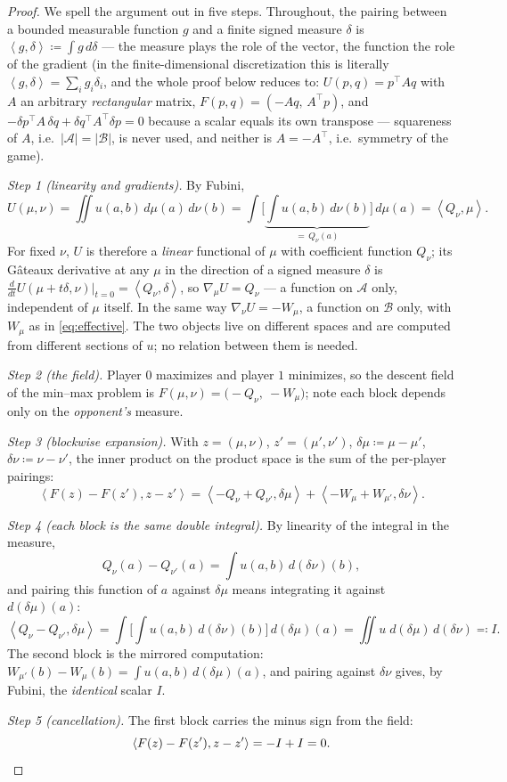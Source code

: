 \documentclass[11pt]{article}
\theoremstyle{definition}
\newcommand{\cA}{\mathcal{A}}
\newcommand{\cB}{\mathcal{B}}
\newcommand{\ip}[2]{\left\langle #1, #2 \right\rangle}
\begin{document}
\begin{proof}
We spell the argument out in five steps. Throughout, the pairing between a
bounded measurable function $g$ and a finite signed measure $\delta$ is
$\ip{g}{\delta} \coloneqq \int g\, d\delta$ --- the measure plays the role of
the vector, the function the role of the gradient (in the finite-dimensional
discretization this is literally $\ip{g}{\delta} = \sum_i g_i \delta_i$, and
the whole proof below reduces to: $U(p,q) = p^\top\! A q$ with $A$ an arbitrary
\emph{rectangular} matrix, $F(p,q) = (-Aq,\, A^\top\! p)$, and
$-\delta p^\top\! A\, \delta q + \delta q^\top\! A^\top \delta p = 0$ because a
scalar equals its own transpose --- squareness of $A$, i.e.\ $|\cA| = |\cB|$,
is never used, and neither is $A = -A^\top$, i.e.\ symmetry of the game).

\emph{Step 1 (linearity and gradients).} By Fubini,
\[
  U(\mu, \nu) = \iint u(a,b)\, d\mu(a)\, d\nu(b)
  = \int \Big[\underbrace{\textstyle\int u(a,b)\, d\nu(b)}_{=\, Q_\nu(a)}
  \Big]\, d\mu(a) = \ip{Q_\nu}{\mu}.
\]
For fixed $\nu$, $U$ is therefore a \emph{linear} functional of $\mu$ with
coefficient function $Q_\nu$; its G\^ateaux derivative at any $\mu$ in the
direction of a signed measure $\delta$ is
$\tfrac{d}{dt} U(\mu + t\delta, \nu)\big|_{t=0} = \ip{Q_\nu}{\delta}$,
so $\nabla_\mu U = Q_\nu$ --- a function on $\cA$ only, independent of $\mu$
itself. In the same way $\nabla_\nu U = -W_\mu$, a function on $\cB$ only,
with $W_\mu$ as in \eqref{eq:effective}. The two objects live on different
spaces and are computed from different sections of $u$; no relation between
them is needed.

\emph{Step 2 (the field).} Player $0$ maximizes and player $1$ minimizes, so
the descent field of the min--max problem is
$F(\mu, \nu) = \big({-}Q_\nu,\ -W_\mu\big)$; note each block depends only on
the \emph{opponent's} measure.

\emph{Step 3 (blockwise expansion).} With $z = (\mu,\nu)$, $z' = (\mu',\nu')$,
$\delta\mu \coloneqq \mu - \mu'$, $\delta\nu \coloneqq \nu - \nu'$, the inner
product on the product space is the sum of the per-player pairings:
\[
  \ip{F(z) - F(z')}{z - z'}
  = \ip{-Q_\nu + Q_{\nu'}}{\delta\mu} + \ip{-W_\mu + W_{\mu'}}{\delta\nu}.
\]

\emph{Step 4 (each block is the same double integral).} By linearity of the
integral in the measure,
\[
  Q_\nu(a) - Q_{\nu'}(a) = \int u(a,b)\, d(\delta\nu)(b),
\]
and pairing this function of $a$ against $\delta\mu$ means integrating it
against $d(\delta\mu)(a)$:
\[
  \ip{Q_\nu - Q_{\nu'}}{\delta\mu}
  = \int\!\Big[\int u(a,b)\, d(\delta\nu)(b)\Big]\, d(\delta\mu)(a)
  = \iint u\; d(\delta\mu)\, d(\delta\nu) \eqqcolon I .
\]
The second block is the mirrored computation: $W_{\mu'}(b) - W_\mu(b) =
\int u(a,b)\, d(\delta\mu)(a)$, and pairing against $\delta\nu$ gives, by
Fubini, the \emph{identical} scalar $I$.

\emph{Step 5 (cancellation).} The first block carries the minus sign from the
field:
\[
  \ip{F(z) - F(z')}{z - z'} = -I + I = 0. \qedhere
\]
\end{proof}
\end{document}
